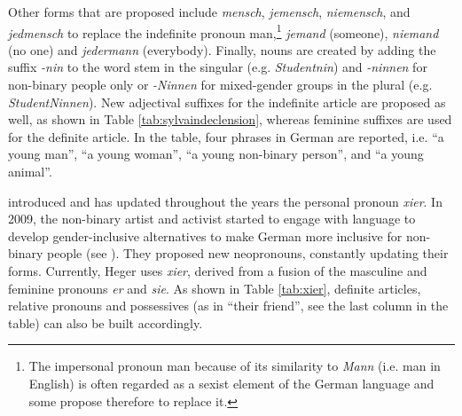 Other forms that are proposed include \textit{mensch}, \textit{jemensch}, \textit{niemensch}, and \textit{jedmensch} to replace the indefinite pronoun man,\footnote{The impersonal pronoun man because of its similarity to \textit{Mann} (i.e. man in English) is often regarded as a sexist element of the German language and some propose therefore to replace it.} \textit{jemand} (someone), \textit{niemand} (no one) and \textit{jedermann} (everybody). Finally, nouns are created by adding the suffix \textit{-nin} to the word stem in the singular (e.g. \textit{Studentnin}) and  \textit{-ninnen} for non-binary people only or\textit{ -Ninnen} for mixed-gender groups in the plural (e.g. \textit{StudentNinnen}). New adjectival suffixes for the indefinite article are proposed as well, as shown in Table \ref{tab:sylvaindeclension}, whereas feminine suffixes are used for the definite article. In the table, four phrases in German are reported, i.e. ``a young man'', ``a young woman'', ``a young non-binary person'', and ``a young animal''.

\begin{table}
        \caption[Declension system according to the Sylvain system]{Declension system according to the Sylvain system (\cite[45]{de2008sylvain})}
    \label{tab:sylvaindeclension}
\end{table}

\textcite{heger2020xier} introduced and has updated throughout the years the personal pronoun \textit{xier}. In 2009, the non-binary artist and activist started to engage with language to develop gender-inclusive alternatives to make German more inclusive for non-binary people (see \cite{hegerhistorie}). They proposed new neopronouns, constantly updating their forms. Currently, Heger uses \textit{xier}, derived from a fusion of the masculine and feminine pronouns \textit{er} and \textit{sie}. As shown in Table \ref{tab:xier}, definite articles, relative pronouns and possessives (as in ``their friend'', see the last column in the table) can also be built accordingly. 

